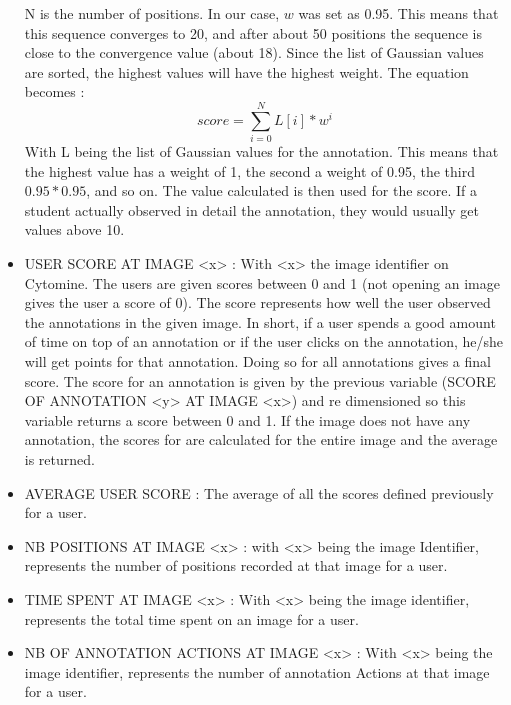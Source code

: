 \documentclass[a4paper,11pt]{report}
\numberwithin{figure}{section} %
\begin{document}
\begin{itemize}
N is the number of positions.
In our case, $w$ was set as 0.95.
This means that this sequence converges to 20, and after about 50 positions the sequence is close to the convergence value (about 18).
Since the list of Gaussian values are sorted, the highest values will have the highest weight.
The equation becomes :
	\[score = \sum\limits_{i=0}^N L[i]*w^i\]
With L being the list of Gaussian values for the annotation.
This means that the highest value has a weight of 1, the second a weight of 0.95, the third $0.95*0.95$, and so on.
The value calculated is then used for the score.
If a student actually observed in detail the annotation, they would usually get values above 10.\\

    \item[\textbullet] USER SCORE AT IMAGE <x> : With <x> the image identifier on Cytomine.
    The users are given scores between 0 and 1 (not opening an image gives the user a score of 0).
    The score represents how well the user observed the annotations in the given image.
    In short, if a user spends a good amount of time on top of an annotation or if the user clicks on the annotation, he/she will get points for that annotation.
    Doing so for all annotations gives a final score.
    The score for an annotation is given by the previous variable (SCORE OF ANNOTATION <y> AT IMAGE <x>) and re dimensioned so this variable returns a score between 0 and 1.
    If the image does not have any annotation, the scores for are calculated for the entire image and the average is returned. \\
    
    \item[\textbullet] AVERAGE USER SCORE : The average of all the scores defined previously for a user. \\
    
    \item[\textbullet] NB POSITIONS AT IMAGE <x> : with <x> being the image Identifier, represents the number of positions recorded at that image for a user. \\
    
   \item[\textbullet] TIME SPENT AT IMAGE <x> : With <x> being the image identifier, represents the total time spent on an image for a user. \\
   
   \item[\textbullet] NB OF ANNOTATION ACTIONS AT IMAGE <x> : With <x> being the image identifier, represents the number of annotation Actions at that image for a user. \\
      

\end{itemize}
\end{document}
